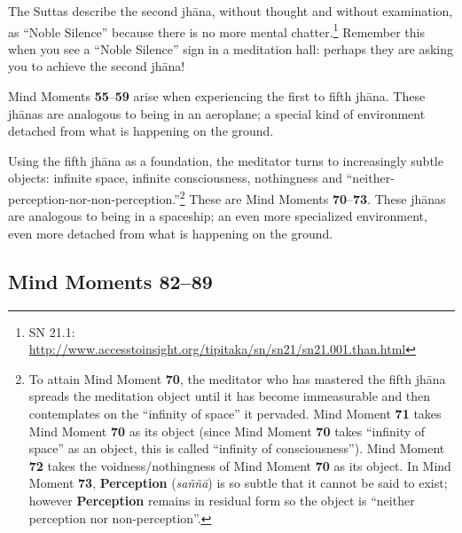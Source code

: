 The Suttas describe the second jhāna, without thought and without examination, as “Noble Silence” because there is no more mental chatter.\footnote{SN 21.1: \url{http://www.accesstoinsight.org/tipitaka/sn/sn21/sn21.001.than.html}} Remember this when you see a “Noble Silence” sign in a meditation hall: perhaps they are asking you to achieve the second jhāna!

Mind Moments \textbf{55}--\textbf{59} arise when experiencing the first to fifth jhāna. These jhānas are analogous to being in an aeroplane; a special kind of environment detached from what is happening on the ground.

Using the fifth jhāna as a foundation, the meditator turns to increasingly subtle objects: infinite space, infinite consciousness, nothingness and “neither-perception-nor-non-perception.”\footnote{To attain Mind Moment \textbf{70}, the meditator who has mastered the fifth jhāna spreads the meditation object until it has become immeasurable and then contemplates on the “infinity of space” it pervaded. Mind Moment \textbf{71} takes Mind Moment \textbf{70} as its object (since Mind Moment \textbf{70} takes “infinity of space” as an object, this is called “infinity of consciousness”). Mind Moment \textbf{72} takes the voidness/nothingness of Mind Moment \textbf{70} as its object. In Mind Moment \textbf{73}, \textbf{Perception} (\textit{saññā}) is so subtle that it cannot be said to exist; however \textbf{Perception} remains in residual form so the object is “neither perception nor non-perception”.} These are Mind Moments \textbf{70}--\textbf{73}. These jhānas are analogous to being in a spaceship; an even more specialized environment, even more detached from what is happening on the ground.

\subsection*{Mind Moments 82--89}

